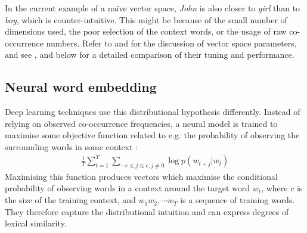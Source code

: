 In the current example of a na{\"i}ve vector space, \textit{John} is also closer to \textit{girl} than to \textit{boy}, which is counter-intuitive. This might be because of the small number of dimensions used, the poor selection of the context words, or the usage of raw co-occurrence numbers. Refer to  and  for the discussion of vector space parameters, and see ,  and
%
 below
%
for a detailed comparison of their tuning and performance.

\subsection{Neural word embedding}
\label{sec:neural-embedding}

Deep learning techniques use this distributional hypothesis
differently. Instead of relying on observed co-occurrence frequencies,
a neural model is trained to maximise some objective function related
to e.g. the probability of observing the surrounding words in some
context \cite{mikolov2013distributed}:
%
\begin{align}
 \frac{1}{T}\sum^{T}_{t=1}\sum_{-c \leq j \leq c, j\neq0} \log p(w_{t+j}|w_t)
  \label{eq:objective-func}
\end{align}
%
\noindent
Maximising this function produces vectors which maximise the
conditional probability of observing words in a context around the
target word $w_t$, where $c$ is the size of the training context, and
$w_1 w_2, \cdots w_T$ is a sequence of training words. They therefore
capture the distributional intuition and can express degrees of
lexical similarity.


